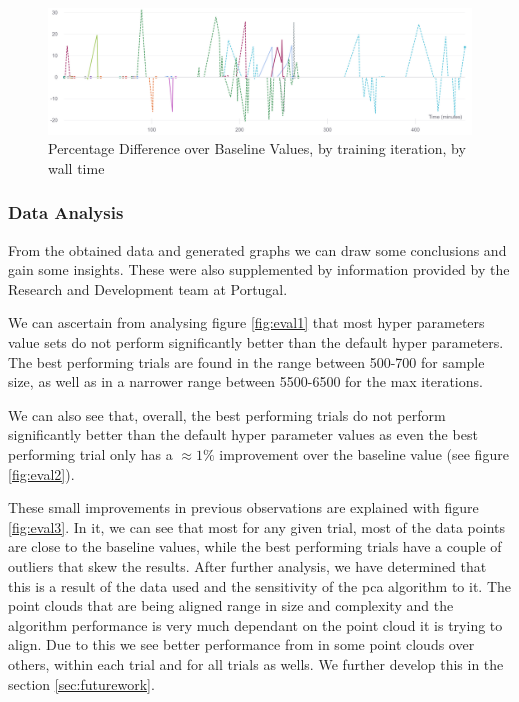 	\begin{figure}[H]
	\centering
	\includegraphics[width=\textwidth, keepaspectratio]{images/timed_timeline.png}
	\caption{Percentage Difference over Baseline Values, by training iteration, by wall time}
	\label{fig:eval5}
	\end{figure}


\subsubsection{Data Analysis}

From the obtained data and generated graphs we can draw some conclusions and gain some insights. These were also supplemented by information provided by the Research and Development team at \faro Portugal.

We can ascertain from analysing figure \ref{fig:eval1} that most hyper parameters value sets do not perform significantly better than the default hyper parameters. The best performing trials are found in the range between 500-700 for sample size, as well as in a narrower range between 5500-6500 for the max iterations.

We can also see that, overall, the best performing trials do not perform significantly better than the default hyper parameter values as even the best performing trial only has a $\approx 1\%$ improvement over the baseline value (see figure \ref{fig:eval2}).

These small improvements in previous observations are explained with figure \ref{fig:eval3}. In it, we can see that most for any given trial, most of the data points are close to the baseline values, while the best performing trials have a couple of outliers that skew the results. After further analysis, we have determined that this is a result of the data used and the sensitivity of the \acrshort{pca} algorithm to it. The point clouds that are being aligned range in size and complexity and the algorithm performance is very much dependant on the point cloud it is trying to align. Due to this we see better performance from in some point clouds over others, within each trial and for all trials as wells. We further develop this in the section \ref{sec:futurework}.

